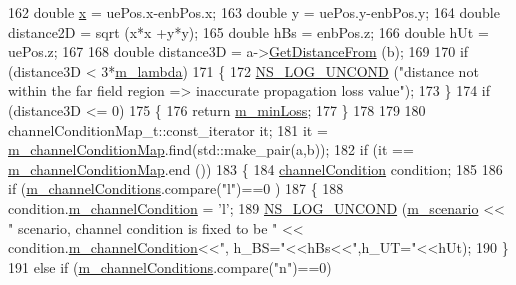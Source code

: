 \begin{DoxyCode}
162         \textcolor{keywordtype}{double} \hyperlink{lte__link__budget__x2__handover__measures_8m_a9336ebf25087d91c818ee6e9ec29f8c1}{x} = uePos.x-enbPos.x;
163         \textcolor{keywordtype}{double} y = uePos.y-enbPos.y;
164         \textcolor{keywordtype}{double} distance2D = sqrt (x*x +y*y);
165         \textcolor{keywordtype}{double} hBs = enbPos.z;
166         \textcolor{keywordtype}{double} hUt = uePos.z;
167 
168         \textcolor{keywordtype}{double} distance3D = a->\hyperlink{classns3_1_1MobilityModel_afa16c20b3c5fd135be075000f0272f31}{GetDistanceFrom} (b);
169 
170         \textcolor{keywordflow}{if} (distance3D < 3*\hyperlink{classMmWave3gppPropagationLossModel_af93c26bcd20ec903b0c70afa4c59cde2}{m\_lambda})
171         \{
172                 \hyperlink{log-macros-disabled_8h_a0b36e5e182b37194f85ef1c5e979fb2e}{NS\_LOG\_UNCOND} (\textcolor{stringliteral}{"distance not within the far field region => inaccurate
       propagation loss value"});
173         \}
174         \textcolor{keywordflow}{if} (distance3D <= 0)
175         \{
176                 \textcolor{keywordflow}{return}  \hyperlink{classMmWave3gppPropagationLossModel_a77d24e66b9afc8afd0a7e52d3735d557}{m\_minLoss};
177         \}
178 
179 
180         channelConditionMap\_t::const\_iterator it;
181         it = \hyperlink{classMmWave3gppPropagationLossModel_a47c60c0cfcc0545dd3039393d21de5ac}{m\_channelConditionMap}.find(std::make\_pair(a,b));
182         \textcolor{keywordflow}{if} (it == \hyperlink{classMmWave3gppPropagationLossModel_a47c60c0cfcc0545dd3039393d21de5ac}{m\_channelConditionMap}.end ())
183         \{
184                 \hyperlink{structchannelCondition}{channelCondition} condition;
185 
186                 \textcolor{keywordflow}{if} (\hyperlink{classMmWave3gppPropagationLossModel_a416f5b42f67f2d950344b4746885230d}{m\_channelConditions}.compare(\textcolor{stringliteral}{"l"})==0 )
187                 \{
188                         condition.\hyperlink{structchannelCondition_a1fbbec1a89c5da0961efaca304ade4d1}{m\_channelCondition} = \textcolor{charliteral}{'l'};
189                         \hyperlink{log-macros-disabled_8h_a0b36e5e182b37194f85ef1c5e979fb2e}{NS\_LOG\_UNCOND} (\hyperlink{classMmWave3gppPropagationLossModel_a3ba2b9e45f4d02e49620faf03f97e898}{m\_scenario} << \textcolor{stringliteral}{" scenario, channel condition
       is fixed to be "} << condition.\hyperlink{structchannelCondition_a1fbbec1a89c5da0961efaca304ade4d1}{m\_channelCondition}<<\textcolor{stringliteral}{", h\_BS="}<<hBs<<\textcolor{stringliteral}{",h\_UT="}<<hUt);
190                 \}
191                 \textcolor{keywordflow}{else} \textcolor{keywordflow}{if} (\hyperlink{classMmWave3gppPropagationLossModel_a416f5b42f67f2d950344b4746885230d}{m\_channelConditions}.compare(\textcolor{stringliteral}{"n"})==0)

\end{DoxyCode}
